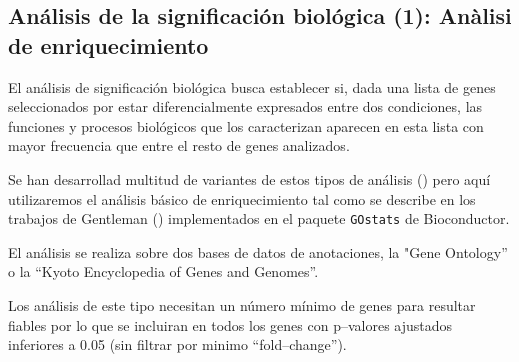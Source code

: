 \documentclass[a4paper]{article}\usepackage[]{graphicx}\usepackage[]{color}
\begin{document}
\subsection{Análisis de la significación biológica (1): Anàlisi de enriquecimiento}

El análisis de significación biológica busca establecer si, dada una lista de genes seleccionados por estar diferencialmente expresados entre dos condiciones, las funciones y procesos biológicos que los caracterizan aparecen en esta lista con mayor frecuencia que entre el resto de genes analizados.

Se han desarrollad multitud de variantes de estos tipos de análisis (\cite{Khatri:2005}) pero aquí utilizaremos el análisis básico de enriquecimiento tal como se describe en los trabajos de Gentleman (\cite{Gentleman:2004}) implementados en el paquete \texttt{GOstats} de Bioconductor.

El análisis se realiza sobre dos bases de datos de anotaciones, la "Gene Ontology'' o la ``Kyoto Encyclopedia of Genes and Genomes''.

Los análisis de este tipo necesitan un número mínimo de genes para resultar fiables por lo que se incluiran en todos los genes con p--valores ajustados inferiores a 0.05 (sin filtrar por minimo ``fold--change'').
\end{document}
